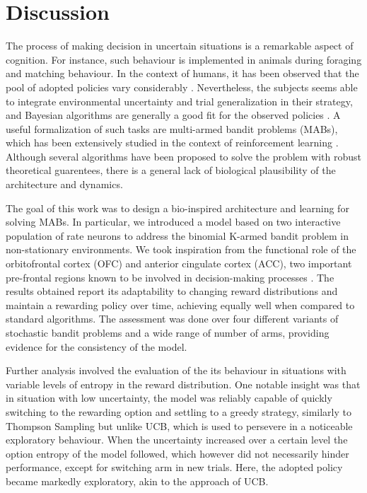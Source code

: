 
\section{Discussion}

The process of making decision in uncertain situations is a remarkable aspect of cognition. For instance, such behaviour is implemented in animals during foraging and matching behaviour.
In the context of humans, it has been observed that the pool of adopted policies vary considerably \cite{steyversBayesianAnalysisHuman2009a}.
Nevertheless, the subjects seems able to integrate environmental uncertainty and trial generalization in their strategy, and Bayesian algorithms are generally a good fit for the observed policies \cite{schulzFindingStructureMultiarmed2020, zhangForgetfulBayesMyopic2013}.
A useful formalization of such tasks are multi-armed bandit problems (MABs), which has been extensively studied in the context of reinforcement learning \cite{suttonReinforcementLearningProblem1998}.
Although several algorithms have been proposed to solve the problem with robust theoretical guarentees, there is a general lack of biological plausibility of the architecture and dynamics.

%
The goal of this work was to design a bio-inspired architecture and learning for solving MABs. In particular, we introduced a model based on two interactive population of rate neurons to address the binomial K-armed bandit problem in non-stationary environments.
We took inspiration from the functional role of the orbitofrontal cortex (OFC) and anterior cingulate cortex (ACC), two important pre-frontal regions known to be involved in decision-making processes \cite{kennerleyDecisionMakingReward2011a, khamassiChapter22Medial2013}.
The results obtained report its adaptability to changing reward distributions and maintain a rewarding policy over time, achieving equally well when compared to standard algorithms.
The assessment was done over four different variants of stochastic bandit problems and a wide range of number of arms, providing evidence for the consistency of the model.

Further analysis involved the evaluation of the its behaviour in situations with variable levels of entropy in the reward distribution.
One notable insight was that in situation with low uncertainty, the model was reliably capable of quickly switching to the rewarding option and settling to a greedy strategy, similarly to Thompson Sampling but unlike UCB, which is used to persevere in a noticeable exploratory behaviour.
When the uncertainty increased over a certain level the option entropy of the model followed, which however did not necessarily hinder performance, except for switching arm in new trials.
Here, the adopted policy became markedly exploratory, akin to the approach of UCB.

